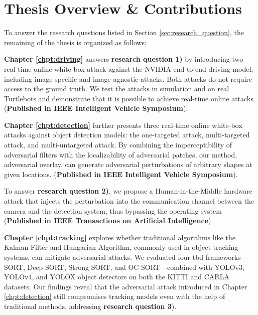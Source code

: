 
\section{Thesis Overview \& Contributions}

To answer the research questions listed in Section \ref{sec:research_question}, the remaining of the thesis is organized as follows:

\vspace{0.5cm}



\noindent \textbf{Chapter \ref{chpt:driving}} answers \textbf{research question 1)} by introducing two real-time online white-box attack against the NVIDIA end-to-end driving model, including image-specific and image-agnostic attacks. Both attacks do not require access to the ground truth. We test the attacks in simulation and on real Turtlebots and demonstrate that it is possible to achieve real-time online attacks (\textbf{Published in IEEE Intelligent Vehicle Symposium}). 

\vspace{0.5cm}

\noindent \textbf{Chapter \ref{chpt:detection}} further presents three real-time online white-box attacks against object detection models: the one-targeted attack, multi-targeted attack, and multi-untargeted attack. By combining the imperceptibility of adversarial filters with the localizability of adversarial patches, our method, adversarial overlay, can generate adversarial perturbations of arbitrary shapes at given locations. (\textbf{Published in IEEE Intelligent Vehicle Symposium}). 

To answer \textbf{research question 2)}, we propose a Human-in-the-Middle hardware attack that injects the perturbation into the communication channel between the camera and the detection system, thus bypassing the operating system (\textbf{Published in IEEE Transactions on Artificial Intelligence}). 

\vspace{0.5cm}

\noindent \textbf{Chapter \ref{chpt:tracking}} explores whether traditional algorithms like the Kalman Filter and Hungarian Algorithm, commonly used in object tracking systems, can mitigate adversarial attacks. We evaluated four \acrshort{tbd} frameworks—SORT, Deep SORT, Strong SORT, and OC SORT—combined with YOLOv3, YOLOv4, and YOLOX object detectors on both the KITTI and CARLA datasets. Our findings reveal that the adversarial attack introduced in Chapter \ref{chpt:detection} still compromises tracking models even with the help of traditional methods, addressing \textbf{research question 3}).

